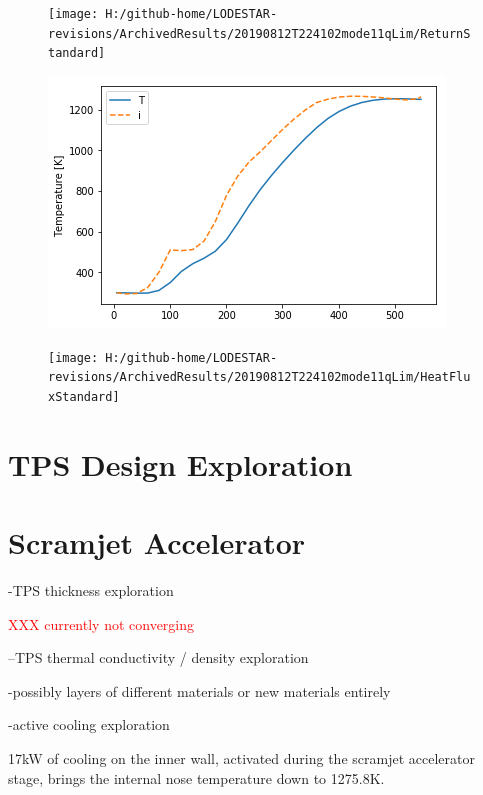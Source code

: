 \begin{figure}[!ht]
\centering
\texttt{[image: H:/github-home/LODESTAR-revisions/ArchivedResults/20190812T224102mode11qLim/ReturnStandard]}
\caption{}
\label{fig:ReturnStandardqlim}
\end{figure}

\begin{figure}[!ht]
\centering
\includegraphics[width=0.7\linewidth]{figures/A1_uncertainty-analysis/TPos1-qlim}
\caption{}
\label{fig:TPos1-qlim}
\end{figure}

\begin{figure}[!ht]
\centering
\texttt{[image: H:/github-home/LODESTAR-revisions/ArchivedResults/20190812T224102mode11qLim/HeatFluxStandard]}
\caption{}
\label{fig:HeatFluxStandard}
\end{figure}


\section{TPS Design Exploration}

\section{Scramjet Accelerator}
-TPS thickness exploration

\textcolor{red}{XXX currently not converging}

--TPS thermal conductivity / density exploration

-possibly layers of different materials or new materials entirely


-active cooling exploration

17kW of cooling on the inner wall, activated during the scramjet accelerator stage, brings the internal nose temperature down to 1275.8K.

